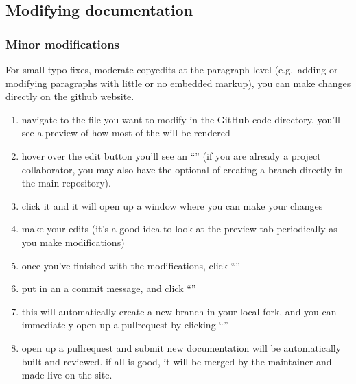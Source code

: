 \documentclass[letterpaper,10pt,english,openany,oneside]{sphinxmanual}
\begin{document}
\subsection{Modifying documentation}
\label{\detokenize{docs/guide-chapter-contributing:modifying-documentation}}

\subsubsection{Minor modifications}
\label{\detokenize{docs/guide-chapter-contributing:minor-modifications}}
\sphinxAtStartPar
For small typo fixes, moderate copyedits at the paragraph level
(e.g. adding or modifying paragraphs with little or no embedded markup),
you can make changes directly on the github website.
\begin{enumerate}
%
\item {} 
\sphinxAtStartPar
navigate to the  file you want to modify in the GitHub code
directory, you’ll see a preview of how most of the  will be
rendered

\item {} 
\sphinxAtStartPar
hover over the edit button \sphinxhyphen{} you’ll see an “” (if you are already a project collaborator,
you may also have the optional of creating a branch directly in the
main repository).

\item {} 
\sphinxAtStartPar
click it and it will open up a window where you can make your changes

\item {} 
\sphinxAtStartPar
make your edits (it’s a good idea to look at the preview tab
periodically as you make modifications)

\item {} 
\sphinxAtStartPar
once you’ve finished with the modifications, click “”

\item {} 
\sphinxAtStartPar
put in an a commit message, and click “”

\item {} 
\sphinxAtStartPar
this will automatically create a new branch in your local fork, and
you can immediately open up a pull\sphinxhyphen{}request by clicking “”

\item {} 
\sphinxAtStartPar
open up a pull\sphinxhyphen{}request and submit \sphinxhyphen{} new documentation will be
automatically built and reviewed. if all is good, it will be merged
by the maintainer and made live on the site.

\end{enumerate}
\end{document}
